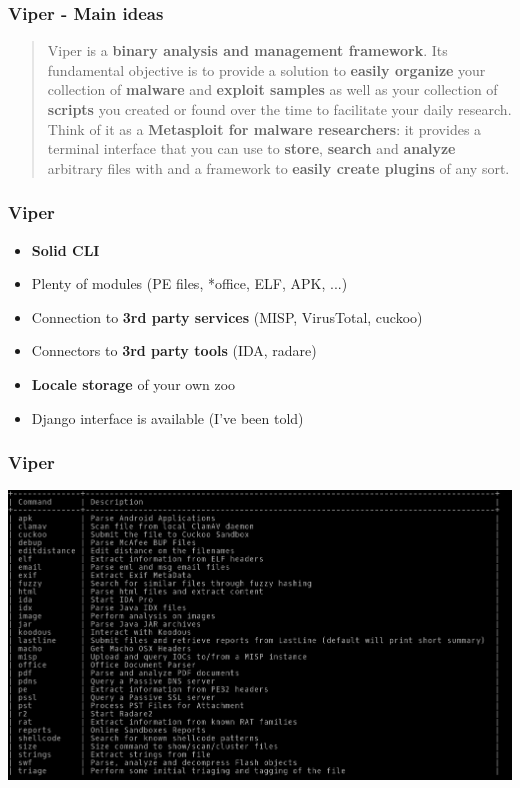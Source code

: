 

\begin{frame}[t,plain]
\titlepage
\end{frame}

\begin{frame}[fragile]
    \frametitle{Viper - Main ideas}
    \begin{quote}
        Viper is a {\bf binary analysis and management framework}. Its
        fundamental objective is to provide a solution to {\bf easily organize}
        your collection of {\bf malware} and {\bf exploit samples} as well as your
        collection of {\bf scripts} you created or found over the time to
        facilitate your daily research. Think of it as a {\bf Metasploit for malware
        researchers}: it provides a terminal interface that you can use to {\bf store},
        {\bf search} and {\bf analyze} arbitrary files with and a framework to
        {\bf easily create plugins} of any sort.
    \end{quote}
\end{frame}


\begin{frame}[fragile]
    \frametitle{Viper}
    \begin{itemize}
        \item {\bf Solid CLI}
        \item Plenty of modules (PE files, *office, ELF, APK, ...)
        \item Connection to {\bf 3rd party services} (MISP, VirusTotal, cuckoo)
        \item Connectors to {\bf 3rd party tools} (IDA, radare)
        \item {\bf Locale storage} of your own zoo
        \item Django interface is available (I've been told)
    \end{itemize}
\end{frame}

\begin{frame}[fragile]
    \frametitle{Viper}
    \includegraphics[scale=0.27]{modules.png}
\end{frame}


